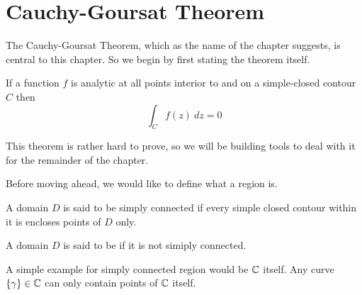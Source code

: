 
\chapter{Cauchy-Goursat Theorem}

The Cauchy-Goursat Theorem, which as the name of the chapter suggests, is central to this chapter. So we begin by first stating the theorem itself. 


\begin{definitionbox}
	\begin{Definition}\label{Cauchy-Goursat Theorem}
		If a function $f$ is analytic at all points interior to and on a simple-closed contour $C$ then
	\[
	\int_{{C}}^{{}} {f\left( z \right) } \: d{z} {} = 0\]

	\end{Definition}
\end{definitionbox}


This theorem is rather hard to prove, so we will be building tools to deal with it for the remainder of the chapter.

Before moving ahead, we would like to define what a  region is.


\begin{definitionbox}
	\begin{Definition}\label{Simply connected Reg}
		A domain $D$ is said to be simply connected if every simple closed contour within it is encloses points of $D$ only. 
	\end{Definition}
\end{definitionbox}

A domain $D$ is said to be  if it is not simiply connected. 

\begin{example}
A simple example for simply connected region would be $\mathbb{C}$ itself. Any curve $\left\{\gamma \right \} \in \mathbb{C}$ can only contain points of $\mathbb{C}$ itself. 
\end{example}

